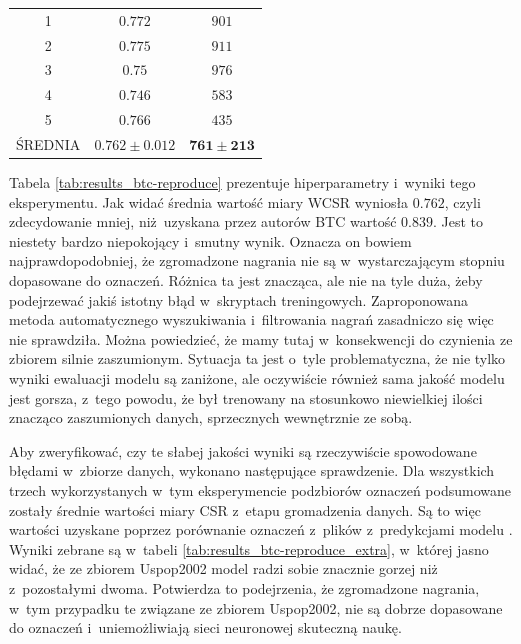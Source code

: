 \begin{table}
{\begin{tabular}{ccc}
        1                 & $0.772$    & $901$    \\
        2                 & $0.775$    & $911$    \\
        3                 & $0.75$    & $976$    \\
        4                 & $0.746$    & $583$    \\
        5                 & $0.766$    & $435$    \\ \hline
        ŚREDNIA           & $\mathbf{0.762 \pm 0.012}$ & $\mathbf{761 \pm 213}$ \\ \hline
    \end{tabular}
    }
\end{table}

Tabela \ref{tab:results_btc-reproduce} prezentuje hiperparametry i~wyniki tego eksperymentu. Jak widać średnia wartość miary WCSR wyniosła $0.762$, czyli zdecydowanie mniej, niż uzyskana przez autorów BTC wartość $0.839$. Jest to niestety bardzo niepokojący i~smutny wynik. Oznacza on bowiem najprawdopodobniej, że zgromadzone nagrania nie są w~wystarczającym stopniu dopasowane do oznaczeń. Różnica ta jest znacząca, ale nie na tyle duża, żeby podejrzewać jakiś istotny błąd w~skryptach treningowych. Zaproponowana metoda automatycznego wyszukiwania i~filtrowania nagrań zasadniczo się więc nie sprawdziła. Można powiedzieć, że mamy tutaj w~konsekwencji do czynienia ze zbiorem silnie zaszumionym. Sytuacja ta jest o~tyle problematyczna, że nie tylko wyniki ewaluacji modelu są zaniżone, ale oczywiście również sama jakość modelu jest gorsza, z~tego powodu, że był trenowany na stosunkowo niewielkiej ilości znacząco zaszumionych danych, sprzecznych wewnętrznie ze sobą.

Aby zweryfikować, czy te słabej jakości wyniki są rzeczywiście spowodowane błędami w~zbiorze danych, wykonano następujące sprawdzenie. Dla wszystkich trzech wykorzystanych w~tym eksperymencie podzbiorów oznaczeń podsumowane zostały średnie wartości miary CSR z~etapu gromadzenia danych. Są to więc wartości uzyskane poprzez porównanie oznaczeń z~plików  z~predykcjami modelu \cite{korzeniowski_feature_2016}. Wyniki zebrane są w~tabeli \ref{tab:results_btc-reproduce_extra}, w~której jasno widać, że ze zbiorem Uspop2002 model radzi sobie znacznie gorzej niż z~pozostałymi dwoma. Potwierdza to podejrzenia, że zgromadzone nagrania, w~tym przypadku te związane ze zbiorem Uspop2002, nie są dobrze dopasowane do oznaczeń i~uniemożliwiają sieci neuronowej skuteczną naukę.

